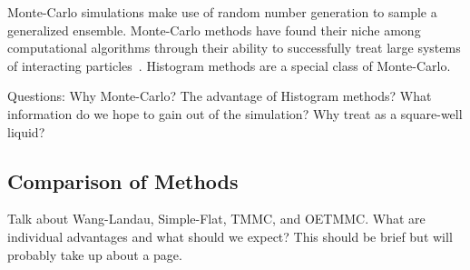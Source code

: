 \documentclass[letterpaper,twocolumn,amsmath,amssymb,pre,aps,10pt]{revtex4-1}
\begin{document}
Monte-Carlo simulations make use of random number generation to sample a generalized
ensemble.  Monte-Carlo methods have found their niche among computational 
algorithms through their ability to successfully treat large systems of interacting 
particles~\cite{landau2014guide, hansen1990theory}.  Histogram methods are a special
class of Monte-Carlo.

Questions: Why Monte-Carlo? The advantage of Histogram methods? What information do
we hope to gain out of the simulation? Why treat as a square-well liquid?

\subsection{Comparison of Methods}

Talk about Wang-Landau, Simple-Flat, TMMC, and OETMMC.  What are individual 
advantages and what should we expect?  This should be brief but will 
probably take up about a page.

\end{document}
